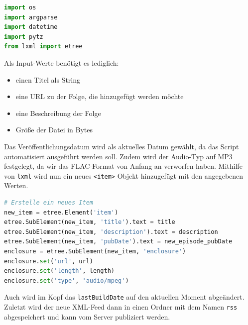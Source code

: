 \documentclass{article}
\begin{document}
\begin{lstlisting}[language=Python, caption=RSS-Feed Generator imports]
import os
import argparse
import datetime
import pytz
from lxml import etree
\end{lstlisting}

Als Input-Werte benötigt es lediglich:

\begin{itemize}
    \item einen Titel als String
    \item eine URL zu der Folge, die hinzugefügt werden möchte
    \item eine Beschreibung der Folge
    \item Größe der Datei in Bytes
\end{itemize}

Das Veröffentlichungsdatum wird als aktuelles Datum gewählt, da das Script automatisiert ausgeführt werden soll. Zudem wird der Audio-Typ auf MP3 festgelegt, da wir das FLAC-Format von Anfang an verworfen haben. Mithilfe von \texttt{lxml} wird nun ein neues \texttt{<item>} Objekt hinzugefügt mit den angegebenen Werten.

\begin{lstlisting}[language=Python, caption=Erstellen eines neuen Feed-Items]
# Erstelle ein neues Item
new_item = etree.Element('item')
etree.SubElement(new_item, 'title').text = title
etree.SubElement(new_item, 'description').text = description
etree.SubElement(new_item, 'pubDate').text = new_episode_pubDate
enclosure = etree.SubElement(new_item, 'enclosure')
enclosure.set('url', url)
enclosure.set('length', length)
enclosure.set('type', 'audio/mpeg')
\end{lstlisting}

Auch wird im Kopf das \texttt{lastBuildDate} auf den aktuellen Moment abgeändert. Zuletzt wird der neue XML-Feed dann in einen Ordner mit dem Namen \texttt{rss} abgespeichert und kann vom Server publiziert werden.
\end{document}
